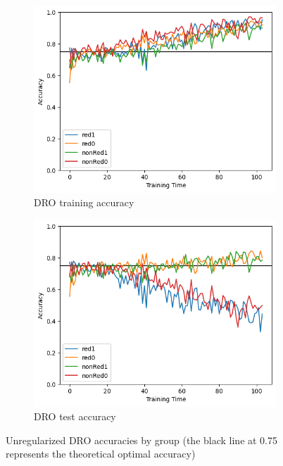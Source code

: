 \documentclass{article}
\begin{document}
\begin{figure}
\begin{subfigure}{.5\textwidth}
  \centering
  \includegraphics[width=1.\linewidth]{images/dro_train_nr.png}
  \caption{DRO training accuracy}
\end{subfigure}
\begin{subfigure}{.5\textwidth}
  \centering
  \includegraphics[width=1.\linewidth]{images/dro_test_nr.png}
  \caption{DRO test accuracy}
\end{subfigure}

\caption{Unregularized DRO accuracies by group (the black line at 0.75 represents the theoretical optimal accuracy)}
\label{dro_nr}
\end{figure}
\end{document}
